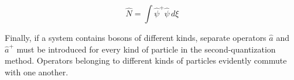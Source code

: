 
\begin{equation}
 \hat N=\int\hat\psi^+\hat\psi\,d\xi
 \tag{64.26}
\end{equation}


Finally, if a system contains bosons of different kinds, separate operators
$\hat a$ and $\hat a^+$ must be introduced for every kind of particle in the
second-quantization method. Operators belonging to different kinds of
particles evidently commute with one another.
